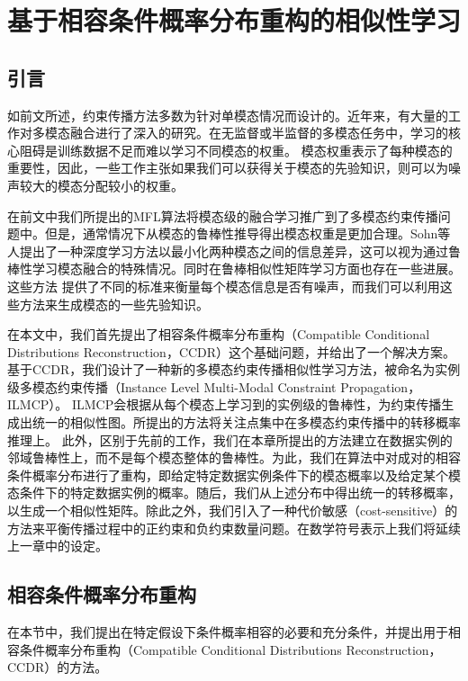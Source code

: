 \chapter{基于相容条件概率分布重构的相似性学习}
\section{引言}
如前文所述，约束传播方法多数为针对单模态情况而设计的。近年来，有大量的工作对多模态融合进行了深入的研究\cite{lahat2015multimodal,poria2017ensemble,yu2017deep,poria2017review,liu2018weakly,kiela2018efficient}。在无监督或半监督的多模态任务中，学习的核心阻碍是训练数据不足而难以学习不同模态的权重。
模态权重表示了每种模态的重要性，因此，一些工作主张如果我们可以获得关于模态的先验知识，则可以为噪声较大的模态分配较小的权重\cite{kumar2011co,liu2013multi}。

在前文中我们所提出的MFL算法将模态级的融合学习推广到了多模态约束传播问题中。但是，通常情况下从模态的鲁棒性推导得出模态权重是更加合理。Sohn等人提出了一种深度学习方法以最小化两种模态之间的信息差异\cite{sohn2014improved}，这可以视为通过鲁棒性学习模态融合的特殊情况。同时在鲁棒相似性矩阵学习方面也存在一些进展\cite{pavan2007dominant,premachandran2013consensus,zhu2014constructing}。这些方法
提供了不同的标准来衡量每个模态信息是否有噪声，而我们可以利用这些方法来生成模态的一些先验知识。

在本文中，我们首先提出了相容条件概率分布重构（Compatible Conditional Distributions Reconstruction，CCDR）这个基础问题，并给出了一个解决方案。基于CCDR，我们设计了一种新的多模态约束传播相似性学习方法，被命名为实例级多模态约束传播（Instance Level Multi-Modal Constraint Propagation，ILMCP）。
ILMCP会根据从每个模态上学习到的实例级的鲁棒性，为约束传播生成出统一的相似性图。所提出的方法将关注点集中在多模态约束传播中的转移概率推理上。
此外，区别于先前的工作，我们在本章所提出的方法建立在数据实例的邻域鲁棒性上，而不是每个模态整体的鲁棒性。为此，我们在算法中对成对的相容条件概率分布进行了重构，即给定特定数据实例条件下的模态概率以及给定某个模态条件下的特定数据实例的概率。随后，我们从上述分布中得出统一的转移概率，以生成一个相似性矩阵。除此之外，我们引入了一种代价敏感（cost-sensitive）的方法来平衡传播过程中的正约束和负约束数量问题。在数学符号表示上我们将延续上一章中的设定。

\section{相容条件概率分布重构}
在本节中，我们提出在特定假设下条件概率相容的必要和充分条件，并提出用于相容条件概率分布重构（Compatible Conditional Distributions Reconstruction，CCDR）的方法。

